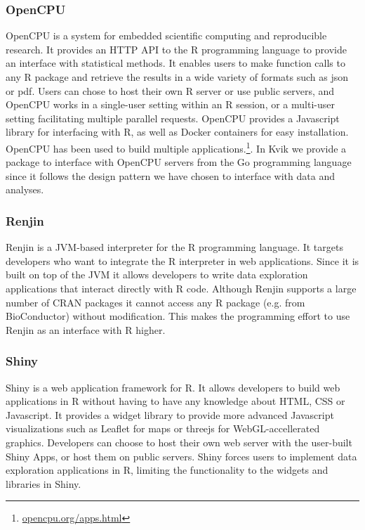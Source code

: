 \subsubsection*{OpenCPU} 
OpenCPU is a system for embedded scientific computing and reproducible
research.\cite{opencpu} It provides an HTTP API to the R programming language to
provide an interface with statistical methods. It enables users to make function
calls to any R package and retrieve the results in a wide variety of formats
such as json or pdf. 
Users can chose to host their own R server or use public servers, and OpenCPU
works in a single-user setting within an R session, or a multi-user setting
facilitating multiple parallel requests. 
OpenCPU provides a Javascript library for interfacing with R, as well as Docker
containers for easy installation. OpenCPU has been used to build multiple
applications.\footnote{\url{opencpu.org/apps.html}}.
In Kvik we provide a package
to interface with OpenCPU servers from the Go programming language since it
follows the design pattern we have chosen to interface with data and analyses. 


\subsubsection*{Renjin} 
Renjin is a JVM-based interpreter for the R programming language.\cite{renjin}
It targets developers who want to integrate the R interpreter in web
applications. Since it is built on top of the JVM it allows developers to write
data exploration applications that interact directly with R code. Although
Renjin supports a large number of CRAN packages it cannot access any R package
(e.g. from BioConductor) without modification. This makes the programming effort
to use Renjin as an interface with R higher. 

\subsubsection*{Shiny} 
Shiny is a web application framework for R.\cite{shiny} It allows developers to
build web applications in R without having to have any knowledge about HTML, CSS
or Javascript. It provides a widget library to provide more advanced Javascript
visualizations such as Leaflet for maps or threejs for WebGL-accellerated
graphics. Developers can choose to host their own web server with the user-built
Shiny Apps, or host them on public servers. Shiny forces users to implement data
exploration applications in R, limiting the functionality to the 
widgets and libraries in Shiny. 

